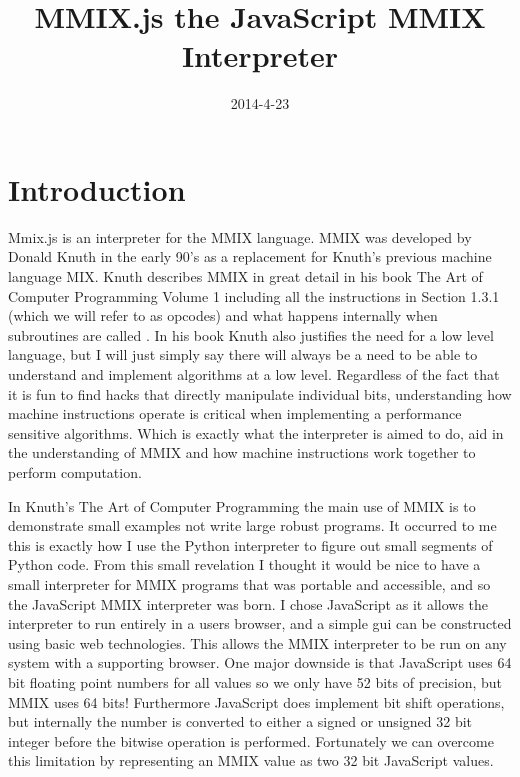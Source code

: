 \documentclass[conference]{IEEEtran}
\begin{document}
\title{MMIX.js the JavaScript MMIX Interpreter}
\date{2014-4-23}


\author{
}

\maketitle

\section{Introduction}

Mmix.js is an interpreter for the MMIX language. MMIX was developed by Donald Knuth in the early 90’s as a replacement for Knuth’s previous machine language MIX. Knuth describes MMIX in great detail in his book The Art of Computer Programming Volume 1 including all the instructions in Section 1.3.1 (which we will refer to as opcodes) and what happens internally when subroutines are called \cite{knuth1968art}. In his book Knuth also justifies the need for a low level language, but I will just simply say there will always be a need to be able to understand and implement algorithms at a low level. Regardless of the fact that it is fun to find hacks that directly manipulate individual bits, understanding how machine instructions operate is critical when implementing a performance sensitive algorithms. Which is exactly what the interpreter is aimed to do, aid in the understanding of MMIX and how machine instructions work together to perform computation.

In Knuth’s The Art of Computer Programming the main use of MMIX is to demonstrate small examples not write large robust programs. It occurred to me this is exactly how I use the Python interpreter to figure out small segments of Python code. From this small revelation I thought it would be nice to have a small interpreter for MMIX programs that was portable and accessible, and so the JavaScript MMIX interpreter was born. I chose JavaScript as it allows the interpreter to run entirely in a users browser, and a simple gui can be constructed using basic web technologies. This allows the MMIX interpreter to be run on any system with a supporting browser. One major downside is that JavaScript uses 64 bit floating point numbers for all values so we only have 52 bits of precision, but MMIX uses 64 bits! Furthermore JavaScript does implement bit shift operations, but internally the number is converted to either a signed or unsigned 32 bit integer before the bitwise operation is performed. Fortunately we can overcome this limitation by representing an MMIX value as two 32 bit JavaScript values.
\end{document}
